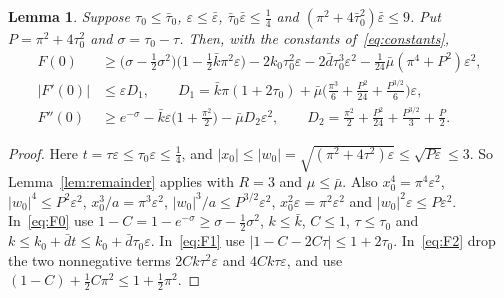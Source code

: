 \documentclass[11pt]{article}
\numberwithin{equation}{section}
\newtheorem{lemma}[theorem]{Lemma}
\theoremstyle{definition}
\theoremstyle{remark}
\begin{document}
\begin{lemma}\label{lem:Fbounds}
Suppose $\tau_0\le\bar\tau_0$, $\varepsilon\le\bar\varepsilon$,
$\bar\tau_0\bar\varepsilon\le\tfrac14$ and
$(\pi^2+4\bar\tau_0^2)\bar\varepsilon\le9$. Put $P=\pi^2+4\tau_0^2$ and
$\sigma=\tau_0-\tau$. Then, with the constants of~\eqref{eq:constants},
\begin{align*}
F(0)&\ge\bigl(\sigma-\tfrac12\sigma^2\bigr)\bigl(1-\tfrac12\bar k\pi^2\varepsilon\bigr)
-2k_0\tau_0^2\varepsilon-2\bar d\tau_0^3\varepsilon^2
-\tfrac1{24}\bar\mu(\pi^4+P^2)\varepsilon^2,\\
|F'(0)|&\le\varepsilon D_1,\qquad D_1=\bar k\pi(1+2\tau_0)
+\bar\mu\bigl(\tfrac{\pi^3}6+\tfrac{P^2}{24}+\tfrac{P^{3/2}}6\bigr)\varepsilon,\\
F''(0)&\ge e^{-\sigma}-\bar k\varepsilon\bigl(1+\tfrac{\pi^2}2\bigr)
-\bar\mu D_2\varepsilon^2,\qquad
D_2=\tfrac{\pi^2}2+\tfrac{P^2}{24}+\tfrac{P^{3/2}}3+\tfrac P2 .
\end{align*}
\end{lemma}

\begin{proof}
Here $t=\tau\varepsilon\le\tau_0\varepsilon\le\tfrac14$, and
$|x_0|\le|w_0|=\sqrt{(\pi^2+4\tau^2)\varepsilon}\le\sqrt{P\varepsilon}\le3$.
So Lemma~\ref{lem:remainder} applies with $R=3$ and
$\mu\le\bar\mu$. Also $x_0^4=\pi^4\varepsilon^2$,
$|w_0|^4\le P^2\varepsilon^2$, $x_0^3/a=\pi^3\varepsilon^2$,
$|w_0|^3/a\le P^{3/2}\varepsilon^2$, $x_0^2\varepsilon=\pi^2\varepsilon^2$
and $|w_0|^2\varepsilon\le P\varepsilon^2$. In~\eqref{eq:F0} use
$1-C=1-e^{-\sigma}\ge\sigma-\tfrac12\sigma^2$, $k\le\bar k$, $C\le1$,
$\tau\le\tau_0$ and $k\le k_0+\bar dt\le k_0+\bar d\tau_0\varepsilon$.
In~\eqref{eq:F1} use $|1-C-2C\tau|\le1+2\tau_0$. In~\eqref{eq:F2} drop the
two nonnegative terms $2Ck\tau^2\varepsilon$ and $4Ck\tau\varepsilon$, and
use $(1-C)+\tfrac12C\pi^2\le1+\tfrac12\pi^2$.
\end{proof}
\end{document}
